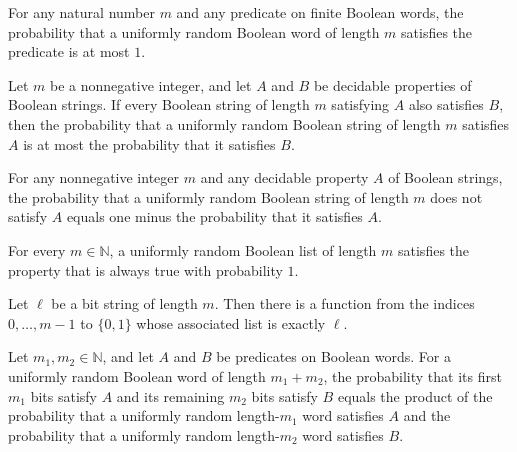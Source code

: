 \begin{theorem}
\label{Randomized.randProb_le_one}
\leanok
{}
For any natural number $m$ and any predicate on finite Boolean words, the probability
that a uniformly random Boolean word of length $m$ satisfies the predicate is at most
$1$.
\end{theorem}

\begin{theorem}
\label{Randomized.randProb_mono}
\leanok
{}
Let $m$ be a nonnegative integer, and let $A$ and $B$ be decidable properties of Boolean
strings. If every Boolean string of length $m$ satisfying $A$ also satisfies $B$, then
the probability that a uniformly random Boolean string of length $m$ satisfies $A$ is at
most the probability that it satisfies $B$.
\end{theorem}

\begin{theorem}
\label{Randomized.randProb_not}
\leanok
{}
For any nonnegative integer $m$ and any decidable property $A$ of Boolean strings, the
probability that a uniformly random Boolean string of length $m$ does not satisfy $A$
equals one minus the probability that it satisfies $A$.
\end{theorem}

\begin{theorem}
\label{Randomized.randProb_true}
\leanok
{}
For every $m\in\mathbb{N}$, a uniformly random Boolean list of length $m$ satisfies the
property that is always true with probability $1$.
\end{theorem}

\begin{theorem}
\label{Randomized.exists_ofFn_eq}
\leanok
{}
Let $\ell$ be a bit string of length $m$. Then there is a function from the indices
$0,\ldots,m-1$ to $\{0,1\}$ whose associated list is exactly $\ell$.
\end{theorem}

\begin{theorem}
\label{Randomized.randProb_split}
\leanok
{}
Let $m_1,m_2\in\mathbb N$, and let $A$ and $B$ be predicates on Boolean words. For a
uniformly random Boolean word of length $m_1+m_2$, the probability that its first $m_1$
bits satisfy $A$ and its remaining $m_2$ bits satisfy $B$ equals the product of the
probability that a uniformly random length-$m_1$ word satisfies $A$ and the probability
that a uniformly random length-$m_2$ word satisfies $B$.
\end{theorem}

